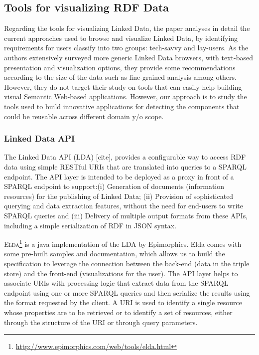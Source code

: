 \subsection{Tools for visualizing RDF Data}
\label{sec:vizrdf}
Regarding the tools for visualizing Linked Data,  the paper \cite{aba2011} analyses in detail the current approaches used to browse and visualize Linked Data, by identifying requirements for users classify into two groups: tech-savvy and lay-users. As the authors extensively surveyed more generic Linked Data browsers, with text-based presentation and visualization options, they provide some recommendations according to the size of the data such as fine-grained analysis among others. However, they do not target their study on tools that can easily help building visual Semantic Web-based applications. However, our approach is to study the tools used to build innovative applications for detecting the components that could be reusable across different domain y/o scope. 


\subsubsection{Linked Data API}
The Linked Data API (LDA) [cite], provides a configurable way to access RDF data using simple RESTful URIs that are translated into queries to a SPARQL endpoint. The API layer is intended to be deployed as a proxy in front of a SPARQL endpoint to support:(i) Generation of documents (information resources) for the publishing of Linked Data; (ii) Provision of sophisticated querying and data extraction features, without the need for end-users to write SPARQL queries and (iii) Delivery of multiple output formats from these APIs, including a simple serialization of RDF in JSON syntax.

\textsc{Elda}\footnote{\url{http://www.epimorphics.com/web/tools/elda.html}} is a java implementation of the LDA by Epimorphics. Elda comes with some pre-built samples and documentation, which allows us to build the specification to leverage the connection between the back-end (data in the triple store) and the front-end (visualizations for the user). The API layer helps to associate URIs with processing logic that extract data from the SPARQL endpoint using one or more SPARQL queries and then serialize the results using the format requested by the client. A URI is used to identify a single resource whose properties are to be retrieved or to identify a set of resources, either through the structure of the URI or through query parameters.

